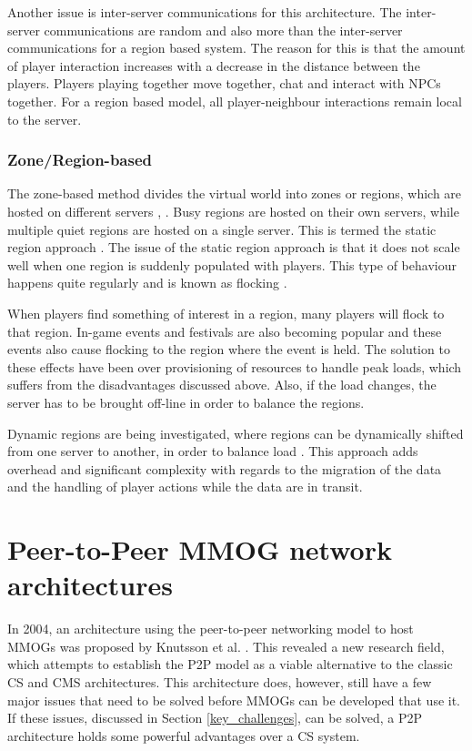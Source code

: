 \documentclass[10pt,a4paper,journal,cspaper,compsoc]{IEEEtran}
\begin{document}
Another issue is inter-server communications for this architecture. The inter-server communications are random and also more than the inter-server
communications for a region based system. The reason for this is that the amount of player interaction increases with a decrease in the distance
between the players. Players playing together move together, chat and interact with \acp{NPC} together. For a region based model, all
player-neighbour interactions remain local to the server.

\subsubsection{Zone/Region-based}
The zone-based method divides the virtual world into zones or regions, which are hosted on different servers \cite{zone_based_stat},
\cite{zone_based_dyn}. Busy regions are hosted on their own servers, while multiple quiet regions are hosted on a single server. This is termed the
static region approach \cite{zone_based_stat}. The issue of the static region approach is that it does not scale well when one region is suddenly
populated with players. This type of behaviour happens quite regularly and is known as flocking \cite{flocking}.

When players find something of interest in a region, many players will flock to that region. In-game events and festivals are also becoming popular
and these events also cause flocking to the region where the event is held. The solution to these effects have been over provisioning of resources to
handle peak loads, which suffers from the disadvantages discussed above. Also, if the load changes, the server has to be brought off-line in order to
balance the regions.

Dynamic regions are being investigated, where regions can be dynamically shifted from one server to another, in order to balance load
\cite{zone_based_dyn}. This approach adds overhead and significant complexity with regards to the migration of the data and the handling of player
actions while the data are in transit.

\section{Peer-to-Peer MMOG network architectures}
\label{p2p_network_models}

In 2004, an architecture using the peer-to-peer networking model to host MMOGs was proposed by Knutsson et al. \cite{knutsson_p2p_first}. This
revealed a new research field, which attempts to establish the P2P model as a viable alternative to the classic \ac{CS} and \ac{CMS} architectures.
This architecture does, however, still have a few major issues that need to be solved before MMOGs can be developed that use it. If these issues,
discussed in Section \ref{key_challenges}, can be solved, a \ac{P2P} architecture holds some powerful advantages over a \ac{CS} system.
\end{document}
